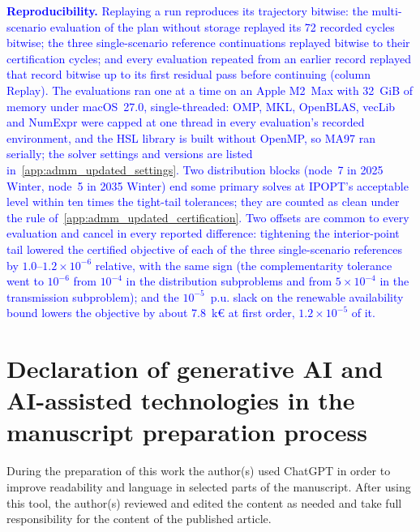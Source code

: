 \documentclass[preprint,12pt]{elsarticle}
\begin{document}
\textcolor{blue}{
    \textbf{Reproducibility.} Replaying a run reproduces its trajectory bitwise: the multi-scenario evaluation of the plan without storage replayed its 72 recorded cycles bitwise; the three single-scenario reference continuations replayed bitwise to their certification cycles; and every evaluation repeated from an earlier record replayed that record bitwise up to its first residual pass before continuing (column Replay). The evaluations ran one at a time on an Apple M2~Max with 32~GiB of memory under macOS~27.0, single-threaded: OMP, MKL, OpenBLAS, vecLib and NumExpr were capped at one thread in every evaluation's recorded environment, and the HSL library is built without OpenMP, so MA97 ran serially; the solver settings and versions are listed in~\ref{app:admm_updated_settings}. Two distribution blocks (node~7 in 2025 Winter, node~5 in 2035 Winter) end some primary solves at IPOPT's acceptable level within ten times the tight-tail tolerances; they are counted as clean under the rule of~\ref{app:admm_updated_certification}. Two offsets are common to every evaluation and cancel in every reported difference: tightening the interior-point tail lowered the certified objective of each of the three single-scenario references by $1.0$--$1.2 \times 10^{-6}$ relative, with the same sign (the complementarity tolerance went to $10^{-6}$ from $10^{-4}$ in the distribution subproblems and from $5 \times 10^{-4}$ in the transmission subproblem); and the $10^{-5}$~p.u. slack on the renewable availability bound lowers the objective by about 7.8~k\euro{} at first order, $1.2 \times 10^{-5}$ of it.
}


\section*{Declaration of generative AI and AI-assisted technologies in the manuscript preparation process}

During the preparation of this work the author(s) used ChatGPT in order to improve readability and language in selected parts of the manuscript. After using this tool, the author(s) reviewed and edited the content as needed and take full responsibility for the content of the published article.

 

\end{document}
